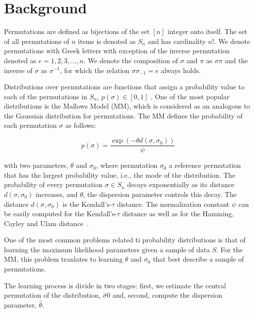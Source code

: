 \documentclass[runningheads]{llncs}
\begin{document}
\citet{ZaeStoBar2014:ppsn,ZaeStoFriFisNauBar2014}
\citet{PerLopStu2015si}

\citep{LopDubPerStuBir2016irace}

\section{Background}



Permutations are defined as bijections of the set $[n]$ integer onto itself. The set of all permutations of $n$ items is denoted as $S_n$ and has cardinality $n!$. We denote permutations with Greek letters with exception of the inverse permutation denoted as $e=1, 2, 3, \ldots,n$. We denote the composition of $\sigma$ and $\pi$ as $\sigma\pi$ and the inverse of $\sigma$ as $\sigma^{-1}$, for which the relation $\sigma\sigma_{-1}=e$ always holds. 

Distributions over permutations are functions that assign a probability value to each of the permutations in $S_n$, $p(\sigma)\in[0,1]$ \cite{critchlow91}. One of the most popular distributions is the Mallows Model (MM), which is considered as an analogous to the Gaussian distribution for permutations. The MM defines the probability of each permutation $\sigma$ as follows:

\begin{equation}
p(\sigma)=\frac{\exp(-\theta d(\sigma, \sigma_0))}{\psi}
\end{equation}

with two parameters, $\theta$ and $\sigma_0$, 
where permutation $\sigma_0$ a reference permutation that has the largest probability value, i.e., the mode of the distribution. The probability of every permutation $\sigma\in S_n$ decays exponentially as its distance $d(\sigma,\sigma_0)$ increases, and $\theta$, the dispersion parameter controls this decay. The distance $d(\sigma,\sigma_0)$ is the Kendall's-$\tau$ distance. The normalization constant $\psi$ can be easily computed for the Kendall's-$\tau$ distance as well as for the Hamming, Cayley and Ulam distance~\cite{Irurozki2016b}. 

One of the most common problems related ti probability distributions is that of learning the maximum likelihood parameters  given a sample of data $S$. For the MM, this problem tranlates to learning $\theta$ and $\sigma_0$ that best describe a sample of permutations. 

The learning process is divide in two stages: first, we estimate the central permutation of the distribution, $\hat\sigma0$ and, second, compute the dispersion parameter, $\hat\theta$. 
\end{document}
